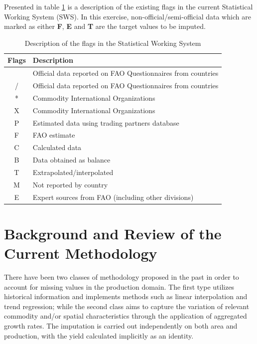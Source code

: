 \documentclass[nojss]{jss}\usepackage[]{graphicx}\usepackage[]{color}
\begin{document}
Presented in table \ref{tab:swsflag} is a description of the existing
flags in the current Statistical Working System (SWS). In this
exercise, non-official/semi-official data which are marked as either
\textbf{F}, \textbf{E} and \textbf{T} are the target values to be
imputed.

\begin{table}[h!]
  \label{tab:swsflag}
  \caption{Description of the flags in the Statistical Working System}
  \begin{center}
    \begin{tabular}{|c||p{12cm}|}
      \hline
      Flags & Description\\
      \hline
      & Official data reported on FAO Questionnaires from countries\\
      / & Official data reported on FAO Questionnaires from countries\\
      * & Commodity International Organizations\\
      X & Commodity International Organizations\\
      P & Estimated data using trading partners database\\
      F & FAO estimate\\
      C & Calculated data\\
      B & Data obtained as balance\\
      T & Extrapolated/interpolated\\
      M & Not reported by country\\
      E & Expert sources from FAO (including other divisions)\\
      \hline
    \end{tabular}
  \end{center}  
\end{table}

\FloatBarrier

\section{Background and Review of the Current Methodology}

There have been two classes of methodology proposed in the past in
order to account for missing values in the production domain. The
first type utilizes historical information and implements methods such
as linear interpolation and trend regression; while the second class
aims to capture the variation of relevant commodity
and/or spatial characteristics through the application of
aggregated growth rates. The imputation is carried out independently
on both area and production, with the yield calculated implicitly as
an identity.
\end{document}
